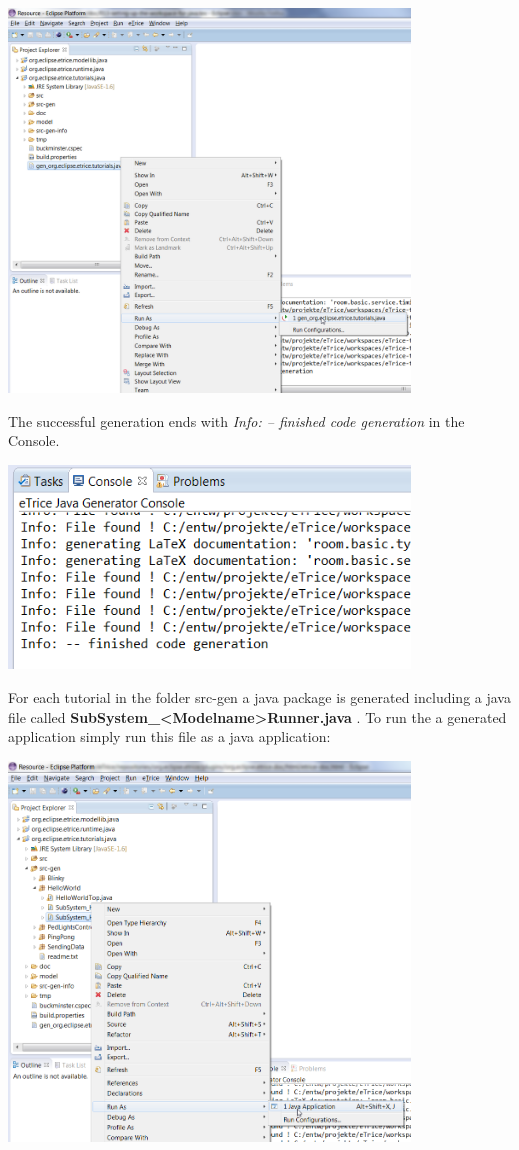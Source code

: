 \includegraphics[width=0.8\textwidth]{images/013-SetupWorkspace05.png}

The successful generation ends with \emph{Info: -- finished code generation} in the Console.

\includegraphics[width=0.8\textwidth]{images/013-SetupWorkspace051.png}


For each tutorial in the folder src-gen a java package is generated including a java file called 
\textbf{SubSystem\_<Modelname>Runner.java} . To run the a generated application simply run this file as a java application:

\includegraphics[width=0.8\textwidth]{images/013-SetupWorkspace06.png}

